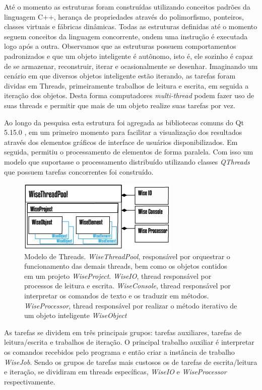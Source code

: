\documentclass[
        english,			
        brazil			        %
        ,<...>]{abntbibufjf}
\begin{document}
Até o momento as estruturas foram construídas utilizando conceitos padrões da linguagem C++, herança de propriedades através do polimorfismo, ponteiros, classes virtuais e fábricas dinâmicas. Todas as estruturas definidas até o momento seguem conceitos da linguagem concorrente, ondem uma instrução é executada logo após a outra. Observamos que as estruturas possuem comportamentos padronizados e que um objeto inteligente é autônomo, isto é, ele sozinho é capaz de se armazenar, reconstruir, iterar e ocasionalmente se desenhar. Imaginando um cenário em que diversos objetos inteligente estão iterando, as tarefas foram dividas em Threads, primeiramente trabalhos de leitura e escrita, em seguida a iteração dos objetos. Desta forma computadores \textit{multi-thread} podem fazer uso de suas threads e permitir que mais de um objeto realize suas tarefas por vez.

Ao longo da pesquisa esta estrutura foi agregada as bibliotecas comuns do Qt 5.15.0 \cite{QTClasses}, em um primeiro momento para facilitar a visualização dos resultados através dos elementos gráficos de interface de usuários disponibilizados. Em seguida, permitiu o processamento de elementos de forma paralela. Com isso um modelo que suportasse o processamento distribuído utilizando classes \textit{QThreads} que possuem tarefas concorrentes foi construído.


\begin{figure}[!htbp]
	\centering
	\includegraphics[scale=1]{Figures/WiseThreadPool.png}
	\caption{Modelo de Threads. \textit{WiseThreadPool}, responsável por orquestrar o funcionamento das demais threads, bem como os objetos contidos em um projeto \textit{WiseProject}. \textit{WiseIO}, thread responsável por processos de leitura e escrita. \textit{WiseConsole}, thread responsável por interpretar os comandos de texto e os traduzir em métodos. \textit{WiseProcessor}, thread responsável por realizar o método iterativo de um objeto inteligente \textit{WiseObject}}
	\label{fig7:threads}
\end{figure}

As tarefas se dividem em três principais grupos: tarefas auxiliares, tarefas de leitura/escrita e trabalhos de iteração. O principal trabalho auxiliar é interpretar os comandos recebidos pelo programa e então criar a instância de trabalho \textit{WiseJob}. Sendo os grupos de tarefas mais custosos os de tarefas de escrita/leitura e iteração, se dividiram em threads específicas, \textit{WiseIO} e \textit{WiseProcessor} respectivamente.
\end{document}
